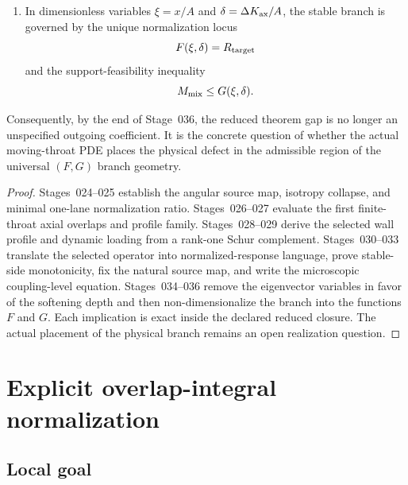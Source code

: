 \begin{theorem}
\begin{enumerate}[leftmargin=2.2em]
  where \(x=A-\lambda_-\) is the selected-mode softening depth.
  \item In dimensionless variables \(\xi=x/A\) and \(\delta=\Delta K_{\rm ax}/A\), the stable branch is governed by the unique normalization locus
  \begin{equation}
  \label{eq:part02-theorem-F-locus}
  F(\xi,\delta)=R_{\rm target}
  \end{equation}
  and the support-feasibility inequality
  \begin{equation}
  \label{eq:part02-theorem-G-frontier}
  M_{\rm mix}\leq G(\xi,\delta).
  \end{equation}
\end{enumerate}
Consequently, by the end of Stage~036, the reduced theorem gap is no longer an unspecified outgoing coefficient.  It is the concrete question of whether the actual moving-throat PDE places the physical defect in the admissible region of the universal \((F,G)\) branch geometry.
\end{theorem}

\begin{proof}
Stages~024--025 establish the angular source map, isotropy collapse, and minimal one-lane normalization ratio.  Stages~026--027 evaluate the first finite-throat axial overlaps and profile family.  Stages~028--029 derive the selected wall profile and dynamic loading from a rank-one Schur complement.  Stages~030--033 translate the selected operator into normalized-response language, prove stable-side monotonicity, fix the natural source map, and write the microscopic coupling-level equation.  Stages~034--036 remove the eigenvector variables in favor of the softening depth and then non-dimensionalize the branch into the functions \(F\) and \(G\).  Each implication is exact inside the declared reduced closure.  The actual placement of the physical branch remains an open realization question.
\end{proof}

\section{Explicit overlap-integral normalization}
\label{sec:part02_conservative_response:explicit-overlap-integral-normalization}

\subsection{Local goal}
\label{subsec:part02-stage024-goal}

